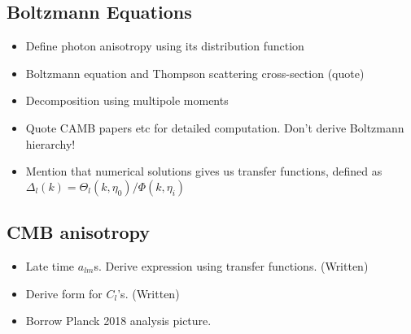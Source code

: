 \subsection{Boltzmann Equations}
\begin{itemize}
	\item Define photon anisotropy using its distribution function
	\item Boltzmann equation and Thompson scattering cross-section (quote)
	\item Decomposition using multipole moments
	\item Quote CAMB papers etc for detailed computation. Don't derive Boltzmann hierarchy!
	\item Mention that numerical solutions gives us transfer functions, defined as $\Delta_l (k) = \Theta_l(k,\eta_0) / \Phi(k,\eta_i)$
\end{itemize}

\subsection{CMB anisotropy}
\begin{itemize}
	\item Late time $a_{lm}$s. Derive expression using transfer functions. (Written)
	\item Derive form for $C_l$'s. (Written)
	\item Borrow Planck 2018 analysis picture. 
\end{itemize}
